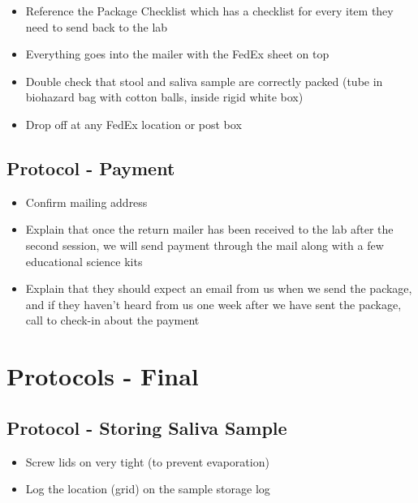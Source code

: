 \documentclass[]{book}
\providecommand{\tightlist}{%
  \setlength{\itemsep}{0pt}\setlength{\parskip}{0pt}}
\begin{document}
\begin{itemize}
\tightlist
\item
  Reference the Package Checklist which has a checklist for every item they need to send back to the lab
\item
  Everything goes into the mailer with the FedEx sheet on top
\item
  Double check that stool and saliva sample are correctly packed (tube in biohazard bag with cotton balls, inside rigid white box)
\item
  Drop off at any FedEx location or post box
\end{itemize}

\hypertarget{protocol---payment}{%
\subsection{Protocol - Payment}\label{protocol---payment}}

\begin{itemize}
\tightlist
\item
  Confirm mailing address
\item
  Explain that once the return mailer has been received to the lab after the second session, we will send payment through the mail along with a few educational science kits
\item
  Explain that they should expect an email from us when we send the package, and if they haven't heard from us one week after we have sent the package, call to check-in about the payment
\end{itemize}

\hypertarget{protocols---final}{%
\section{Protocols - Final}\label{protocols---final}}

\hypertarget{protocol---storing-saliva-sample}{%
\subsection{Protocol - Storing Saliva Sample}\label{protocol---storing-saliva-sample}}

\begin{itemize}
\tightlist
\item
  Screw lids on very tight (to prevent evaporation)
\item
  Log the location (grid) on the sample storage log
\end{itemize}
\end{document}
